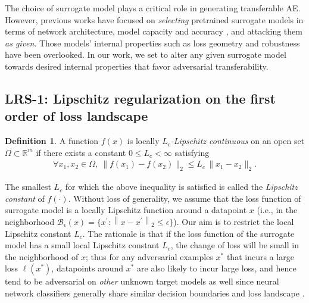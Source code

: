 \documentclass[letterpaper]{article} %
\theoremstyle{plain}
\theoremstyle{definition}
\newtheorem{definition}{Definition}
\newcommand{\fref}[1]{Fig.~\ref{#1}}
\newcommand{\red}[1]{\textcolor{red}{[#1]}}
\newcommand{\blue}[1]{\textcolor{blue}{[#1]}}
\begin{document}
The choice of surrogate model plays a critical role in generating transferable AE. However, previous works have focused on {\em selecting} pretrained surrogate models in terms of network architecture, model capacity and accuracy \cite{wu2020towards}, and 
attacking them \emph{as given}. Those models' internal properties such as loss geometry and robustness have been overlooked. In our work, we set to alter any given surrogate model towards desired internal properties that favor adversarial transferability.

\subsection{LRS-1: Lipschitz regularization on the first order of loss landscape}

\begin{definition} \label{def:lip_continous}
A function $f(x)$ is locally \emph{$L_c$-Lipschitz continuous} on an open set $\Omega \subset \mathbb{R}^m$  if there exists a constant $0 \leq L_c<\infty$ satisfying
\begin{align*}
  \forall x_1, x_2 \in \Omega,\ \|f(x_1) - f(x_2)\|_2 \leq L_c\,\|x_1 - x_2\|_2.
\end{align*}

\end{definition}

The smallest $L_c$ for which the above inequality is satisfied is called the {\em Lipschitz constant} of $f(\cdot)$. Without loss of generality, we assume that the loss function of surrogate model is a locally Lipschitz function around a datapoint $x$ (i.e., in the neighborhood $\mathcal{B}_\epsilon(x)=\{ x^{\prime}:\left\|x-x^{\prime}\right\|_2 \leq \epsilon \}$). Our aim is to restrict the local Lipschitz constant $L_c$. The rationale is that if the loss function of the surrogate model has a small local Lipschitz constant $L_c$, the change of loss will be small in the neighborhood of $x$; thus for any adversarial examples $x^*$ that incurs a large loss $\ell(x^*)$, datapoints around $x^*$ are also likely to incur large loss, and hence tend to be adversarial on {\em other} unknown target models as well since neural network classifiers generally share similar decision boundaries and loss landscape \cite{liu2017delving}. %
\end{document}

